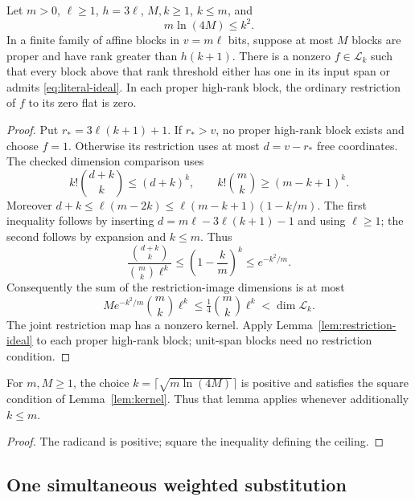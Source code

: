 \begin{lemma}\label{lem:kernel}
Let \(m>0\), \(\ell\ge1\), \(h=3\ell\), \(M,k\ge1\), \(k\le m\), and
\[
 m\ln(4M)\le k^2.
\]
In a finite family of affine blocks in \(v=m\ell\) bits, suppose at most
\(M\) blocks are proper and have rank greater than \(h(k+1)\).
There is a nonzero \(f\in\mathcal L_k\) such that every block above
that rank threshold either has one in its input span or admits
\eqref{eq:literal-ideal}. In each proper high-rank block, the ordinary
restriction of \(f\) to its zero flat is zero.
\end{lemma}
\begin{proof}
Put \(r_*=3\ell(k+1)+1\). If \(r_*>v\), no proper high-rank block
exists and choose \(f=1\). Otherwise its restriction uses at most
\(d=v-r_*\) free coordinates. The checked dimension comparison uses
\[
 k!\binom{d+k}{k}\le(d+k)^k,\qquad
 k!\binom mk\ge(m-k+1)^k.
\]
Moreover \(d+k\le\ell(m-2k)\le\ell(m-k+1)(1-k/m)\).
The first inequality follows by inserting \(d=m\ell-3\ell(k+1)-1\)
and using \(\ell\ge1\); the second follows by expansion and \(k\le m\).
Thus
\[
 \frac{\binom{d+k}{k}}{\binom mk\ell^k}
 \le\left(1-\frac{k}{m}\right)^k\le e^{-k^2/m}.
\]
Consequently the sum of the restriction-image dimensions is at most
\[
 M e^{-k^2/m}\binom mk\ell^k
 \le\tfrac14\binom mk\ell^k<\dim\mathcal L_k.
\]
The joint restriction map has a nonzero kernel. Apply
Lemma~\ref{lem:restriction-ideal} to each proper high-rank block;
unit-span blocks need no restriction condition.
\end{proof}

\begin{corollary}\label{cor:kernel-parameter}
For \(m,M\ge1\), the choice \(k=\lceil\sqrt{m\ln(4M)}\rceil\) is
positive and satisfies the square condition of Lemma~\ref{lem:kernel}.
Thus that lemma applies whenever additionally \(k\le m\).
\end{corollary}
\begin{proof}
The radicand is positive; square the inequality defining the ceiling.
\end{proof}

\subsection{One simultaneous weighted substitution}

